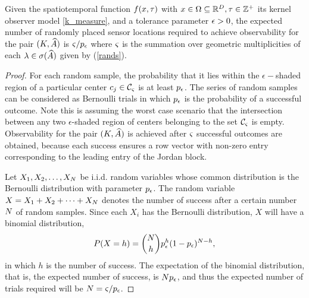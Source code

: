 \begin{theorem}\label{thm:r1}
	Given the spatiotemporal function $ f(x,\tau) $ with $ x \in \Omega \subseteq  \mathbb{R}^{D}, \tau\in \mathbb{Z}^+  $ its kernel observer model \eqref{k_measure}, and a tolerance parameter $\epsilon>0$, the expected number of randomly placed sensor locations required to achieve observability for the pair $ (K,\widehat{A}) $ is $ \varsigma/{p_{\epsilon}} $ where $ \varsigma $ is the summation over geometric multiplicities of each $ \lambda \in \sigma(\widehat{A}) $  given by  (\ref{rands}).
\end{theorem}
\begin{proof}
	For each random sample, the probability that it lies within the $ \epsilon- $shaded region of a particular center $ c_j \in \mathcal{C}_\varsigma$
	is at least $ p_{\epsilon} $. The series of random samples can be considered as Bernoulli trials in which $p_{\epsilon}$ is the probability of a successful outcome. Note this is assuming the worst case scenario that the intersection between any two $ \epsilon $-shaded region of centers belonging to the set  $ \mathcal{C}_\varsigma $ is empty. Observability for the pair $ (K, \widehat{A}) $ is achieved after $ \varsigma  $ successful outcomes are obtained, because each success ensures a row vector with non-zero entry corresponding to the leading entry of the Jordan block. 
	
	Let $ X_1, X_2, \dots, X_N $ be i.i.d. random variables whose common distribution is the Bernoulli distribution with parameter $p_{\epsilon}$. The random variable $ X = X_1 + X_2+ \dots+ X_N $ denotes the number of success after a certain number $ N $ of random samples. Since each $ X_i $ has the Bernoulli distribution, $ X $ will have a binomial distribution, 
	\begin{equation*}
	P(X=h) = {N \choose h}p_{\epsilon}^h (1-p_{\epsilon})^{N-h},
	\end{equation*}
	in which $ h  $ is the number of success. The expectation of the binomial distribution, that is, the expected number of success, is $ Np_{\epsilon} $, and thus the expected number of trials required will be $ N = \varsigma/p_{\epsilon}$.
\end{proof}

